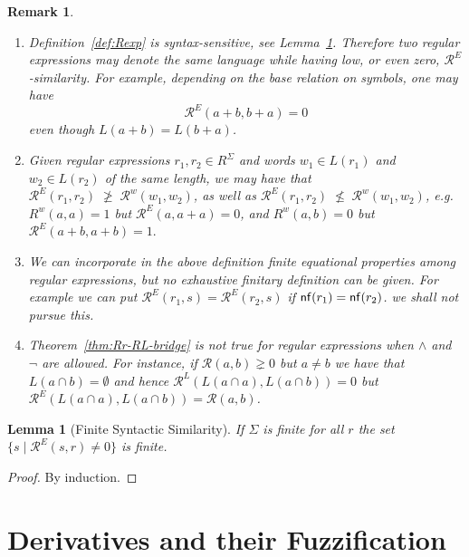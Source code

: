 \documentclass{article}
\def\eg{{\em e.g. }}
\newtheorem{lemma}{Lemma}[section]
\newtheorem{remark}{Remark}[section]
\begin{document}
\begin{remark}\label{rem:syntax-semantics-exceptions}
\hfill \begin{enumerate}
\item Definition~\ref{def:Rexp} is syntax-sensitive, see Lemma~\ref{lemma:syntactic-similarity}.
Therefore two regular expressions may denote the same language while having low, or even zero, $\mathcal{R}^E$-similarity.
For example, depending on the base relation on symbols, one may have
\[
\mathcal{R}^E(a+b,b+a)=0
\]
even though $L(a+b)=L(b+a)$. 
\item Given regular expressions $r_1,r_2\in R^\Sigma$ and words $w_1\in L(r_1)$ and $w_2\in L(r_2)$ of the same length, we may have  that $\mathcal{R}^{E}(r_1,r_2)\; \ngeq \; \mathcal R^w(w_1,w_2)$, as well as $\mathcal{R}^{E}(r_1,r_2)\; \nleq \; \mathcal R^w(w_1,w_2)$, \eg $R^w(a,a)=1$ but $\mathcal{R}^{E}(a,a+a)=0$, and $R^w(a,b)=0$ but $\mathcal{R}^{E}(a+b,a+b)=1.$
\item We can incorporate in the above definition finite equational properties among regular expressions, but no exhaustive finitary definition can be given. For example we can put $\mathcal R^E(r_1,s) = \mathcal R^E(r_2,s)$ if ${\sf nf}(r_1)={\sf nf}(r_2)$. we shall not pursue this.
\item %
{\color{red}Theorem~\ref{thm:Rr-RL-bridge} is not true for  regular expressions when $\wedge$ and $\neg$ are allowed. For instance, if $\mathcal R(a,b)\gneq 0$ but $a\neq b$ we have that $L(a\cap b)=\emptyset$ and hence $\mathcal R^L(L(a\cap a),L(a\cap b))=0$ but $\mathcal R^E(L(a\cap a),L(a\cap b))=\mathcal R(a,b)$. }
\end{enumerate}
\end{remark}

\begin{lemma}[Finite Syntactic Similarity]\label{lemma:syntactic-similarity}
If $\Sigma$ is finite for all $r$ the set $\{ s\mid \mathcal R^E(s,r)\neq 0\}$ is finite.
\end{lemma}
\begin{proof}
By induction.
\end{proof}

\section{Derivatives and their Fuzzification}
\end{document}
